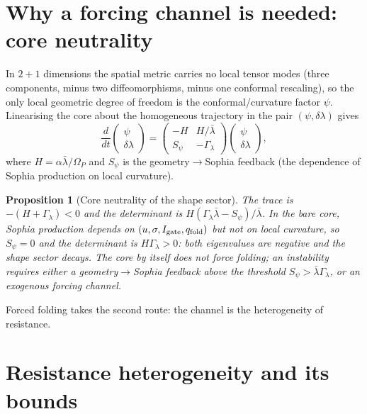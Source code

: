 \documentclass[11pt,a4paper,oneside]{book}
\newcommand{\Op}{\Omega_P}
\newcommand{\Igate}{I_{\rm gate}}
\newcommand{\qf}{q_{\rm fold}}
\theoremstyle{plain}
\newtheorem{proposition}{Proposition}[chapter]
\theoremstyle{definition}
\theoremstyle{remark}
\begin{document}
\section{Why a forcing channel is needed: core neutrality}\label{forcedfolding:sec:neutral}

In $2{+}1$ dimensions the spatial metric carries no local tensor modes (three components, minus two
diffeomorphisms, minus one conformal rescaling), so the only local geometric degree of freedom is the
conformal/curvature factor $\psi$. Linearising the core about the homogeneous trajectory in the pair
$(\psi,\delta\lambda)$ gives
\begin{equation}
\frac{d}{dt}\begin{pmatrix}\psi\\ \delta\lambda\end{pmatrix}
=\begin{pmatrix}-H & H/\bar\lambda\\ S_\psi & -\Gamma_\lambda\end{pmatrix}
\begin{pmatrix}\psi\\ \delta\lambda\end{pmatrix},
\end{equation}
where $H=\alpha\bar\lambda/\Op$ and $S_\psi$ is the geometry$\to$Sophia feedback (the dependence of
Sophia production on local curvature).

\begin{proposition}[Core neutrality of the shape sector]\label{forcedfolding:prop:neutral}
The trace is $-(H+\Gamma_\lambda)<0$ and the determinant is
$H(\Gamma_\lambda\bar\lambda-S_\psi)/\bar\lambda$. In the bare core, Sophia production depends on
$(u,\sigma,\Igate,\qf)$ but not on local curvature, so $S_\psi=0$ and the determinant is
$H\Gamma_\lambda>0$: both eigenvalues are negative and the shape sector decays. The core by itself does
not force folding; an instability requires either a geometry$\to$Sophia feedback above the threshold
$S_\psi>\bar\lambda\Gamma_\lambda$, or an exogenous forcing channel.
\end{proposition}

Forced folding takes the second route: the channel is the heterogeneity of resistance.

\section{Resistance heterogeneity and its bounds}\label{forcedfolding:sec:het}
\end{document}
